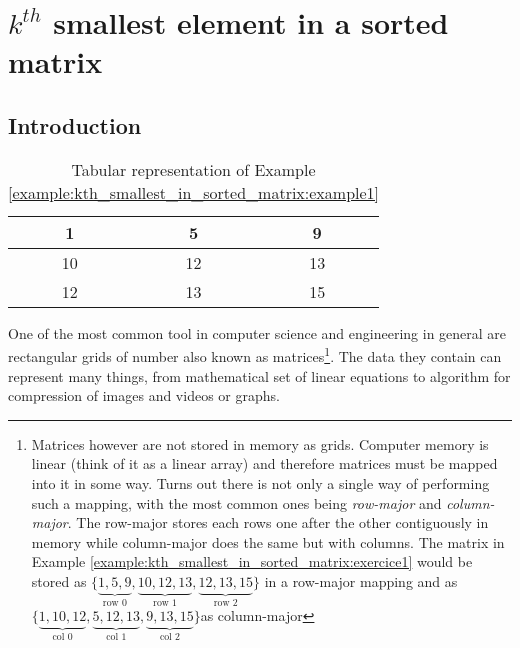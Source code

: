 %



\chapter{$k^{th}$ smallest element in a sorted matrix}
\label{ch:kth_smallest_in_sorted_matrix}
\section*{Introduction}
\begin{wraptable}{r}{4.5cm}
	\centering
	\begin{framed}  
	\begin{tabular}{|c|c|c|}
	\hline
	1  & 5  & 9  \\ \hline
	10 & 12 & 13 \\ \hline
	12 & 13 & 15 \\ \hline
\end{tabular}%
\caption{Tabular representation of Example \ref{example:kth_smallest_in_sorted_matrix:example1}}
\label{tab:kth_smallest_in_sorted_matrix:example1}
\end{framed}
\end{wraptable} 

One of the most common tool in computer science and engineering in general are rectangular grids of number also known as matrices\footnote{Matrices however are not stored in memory as grids. Computer memory is linear (think of it as a linear array) and therefore matrices must be mapped into it in some way. Turns out there is not only a single way of performing such a mapping, with the most common ones being \textit{row-major} and \textit{column-major}. The row-major stores each rows one after the other contiguously in memory  while column-major does the same but with columns. The matrix in Example \ref{example:kth_smallest_in_sorted_matrix:exercice1} would be stored as $\{\underbrace{1,5,9}_{\text{row 0}},\underbrace{10,12,13}_{\text{row 1}},\underbrace{12,13,15}_{\text{row 2}}\}$ in a row-major mapping and as $\{\underbrace{1,10,12}_{\text{col 0}},\underbrace{5,12,13}_{\text{col 1}},\underbrace{9,13,15}_{\text{col 2}}\}$as column-major}. The data they  contain can represent many things, from mathematical set of linear equations to algorithm for compression of images and videos or graphs.

